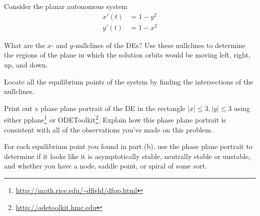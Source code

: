\documentclass[boxes]{gsypset}
\begin{document}
	\begin{problem}
		Consider the planar autonomous system 
		\begin{align*}
			x'(t) &= 1-y^2\\
			y'(t) &= 1-x^2
		\end{align*}
		
		\begin{subproblems}
			\subproblem 
				What are the $x$- and $y$-nullclines of the DEs? 
				Use these nullclines to determine the regions of the plane in which 
				the solution orbits would be moving left, right, up, and down.
				\begin{solution}
					
				\end{solution}
			\subproblem 
				Locate all the equilibrium points of the system 
				by finding the intersections of the nullclines.
				\begin{solution}
					
				\end{solution}
			\subproblem 
				Print out a phase plane portrait of the DE in the rectangle $|x|\leq 3, |y| \leq 3$ 
				using either pplane\footnote{\url{http://math.rice.edu/~dfield/dfpp.html}} or
				ODEToolkit\footnote{\url{http://odetoolkit.hmc.edu}}. 
				Explain how this phase plane portrait is consistent with all of the 
				observations you've made on this problem.
				\begin{solution}
					
				\end{solution}
			\subproblem 
				For each equilibrium point you found in part (b), 
				use the phase plane portrait to determine if it looks like it is 
				asymptotically stable, neutrally stable or unstable, and 
				whether you have a node, saddle point, or spiral of some sort.
				\begin{solution}
					
				\end{solution}
		\end{subproblems}
	\end{problem}
	
\end{document}
